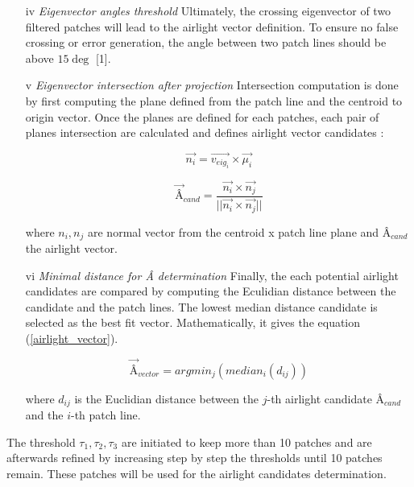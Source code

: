 \documentclass[conference]{IEEEtran}
\begin{document}
\begin{itemize}[]
\item[iv] \textit{Eigenvector angles threshold} Ultimately, the crossing eigenvector of two filtered patches will lead to the 
airlight vector definition.  To ensure no false crossing or error generation, the angle between two patch lines should be above 
$15 \deg$ [1].
\item[v] \textit{Eigenvector intersection after projection}  Intersection computation is done by first computing the plane defined
 from the patch line and the centroid to origin vector.  Once the planes are defined for each patches, each pair of planes 
 intersection are calculated and defines airlight vector candidates :

\begin{equation}
\label{Normal_vector}
\vec{n_i} = \vec{v_{eig_i}} \times \vec{\mu_i}
\end{equation}

\begin{equation}
\label{airlight_candidate}
\vec{\text{Â}}_{cand} = \frac{\vec{n_i} \times \vec{n_j}}{||\vec{n_i} \times \vec{n_j}||} 
\end{equation}

where $n_i, n_j$ are normal vector from the {centroid x patch line} plane and $\text{Â}_{cand}$ the airlight vector.
\item[vi] \textit{Minimal distance for Â determination} Finally, the each potential airlight candidates are compared by 
computing the Eculidian distance between the candidate and the patch lines.  The lowest median distance candidate is selected as 
the best fit vector.  Mathematically, it gives the equation (\ref{airlight_vector}).

\begin{equation}
\label{airlight_vector}
\vec{\text{Â}}_{vector} = argmin_j(median_i(d_{ij})) 
\end{equation}

where $d_{ij}$ is the Euclidian distance between the $j$-th airlight candidate $\text{Â}_{cand}$ and the $i$-th patch line.
\end{itemize}   

The threshold $\tau_1, \tau_2, \tau_3$ are initiated to keep more than 10 patches and are afterwards refined by increasing step
by step the thresholds until 10 patches remain.  These patches will be used for the airlight candidates determination.
\end{document}
